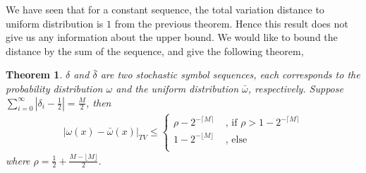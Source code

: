 \documentclass{article}
\newtheorem{theorem}{Theorem}
\begin{document}
We have seen that for a constant sequence, the total variation distance to uniform distribution is $1$ from the previous theorem. Hence this result does not give us any information about the upper bound. We would like to bound the distance by the sum of the sequence, and give the following theorem, 
\begin{theorem}
$\delta$ and $\bar{\delta}$ are two stochastic symbol sequences, each corresponds to the probability distribution $\omega$ and the uniform distribution $\bar{\omega}$, respectively. Suppose $\sum_{i=0}^\infty |\delta_i - \frac{1}{2}| = \frac{M}{2}$, then
\begin{eqnarray}
|\omega(x)-\bar{\omega}(x)|_{TV} \le  \left\{ \begin{array}{cl}
                                   \rho - 2^{-\lceil M \rceil } &\text{ , if } \rho>1-2^{-\lceil M \rceil }\\
                                    1-2^{-\lfloor M \rfloor}    &\text{ , else}                                   \\
                                           \end{array} \right. 
\end{eqnarray}
where $\rho = \frac{1}{2} +  \frac{M-\lfloor M \rfloor}{2}$.
\end{theorem}
\end{document}

